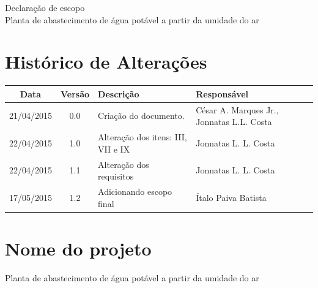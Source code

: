 % 
% 
% 


\begin{center}
 {\large Declaração de escopo}\\[0.2cm]
 {Planta de abastecimento de água potável a partir da umidade do ar}\\
 \end{center}
 
 \section*{Histórico de Alterações}
\begin{table}[h]
\centering
\begin{tabular}{|c|c|p{6cm}|p{5cm}|}

\hline
Data & Versão & Descrição & Responsável\\
\hline                               
21/04/2015 & 0.0 & Criação do documento. & César A. Marques Jr., Jonnatas L.L. Costa\\
\hline
22/04/2015 & 1.0 & Alteração dos itens: III, VII e IX & Jonnatas L. L. Costa\\
\hline
22/04/2015 & 1.1 & Alteração dos requisitos & Jonnatas L. L. Costa\\
\hline
17/05/2015 & 1.2 & Adicionando escopo final & Ítalo Paiva Batista\\
\hline
\end{tabular}
\end{table}

\section*{Nome do projeto}
  Planta de abastecimento de água potável a partir da umidade do ar
  
